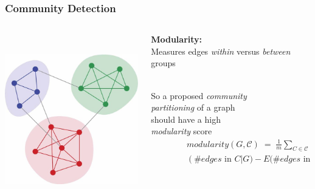 \documentclass[xcolor={dvipsnames}]{beamer}
\begin{document}
\frame
{
\frametitle{Community Detection}

\begin{columns}
\begin{column}{.3\textwidth}

${}$\\
\vspace{.1em}

\includegraphics[width=2.75in]{stuff/communities.jpg}

\end{column}
\begin{column}{.75\textwidth}

\vspace{-.7em}

\textbf{Modularity:} \\Measures edges \emph{within} versus \emph{between} groups\\
${}$

\hspace{1.5in}So a  proposed \emph{community}\\ 
\hspace{1.5in}\emph{partitioning} of a graph\\
\hspace{1.5in}should have a high\\
\hspace{1.5in}\emph{modularity} score \\

\begin{align*}
\quad\quad\quad {}& modularity(G,\mathcal{C}) \; = \; \frac{1}{m} \sum_{C \in \mathcal{C}} \\
\quad\quad\quad  {}&   \left( 
\#edges \text{ in } C|G) - E(\#edges  \text{ in } C|G_R
\right)
\end{align*}

\vspace{-.5em}





\end{column}
\end{columns}}
\end{document}
